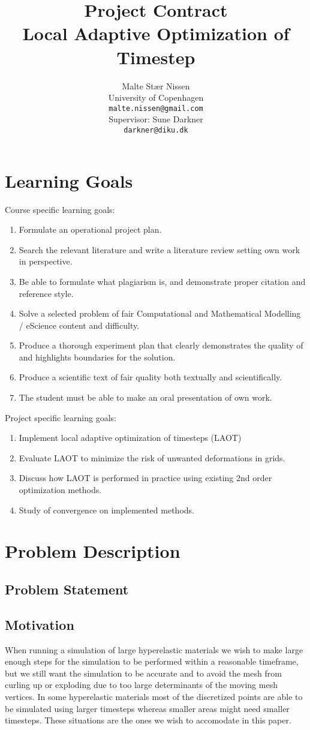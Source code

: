 \documentclass[11pt,a4paper]{article}
\title{Project Contract\\Local Adaptive Optimization of Timestep}
\author{Malte Stær Nissen\\University of Copenhagen\\\texttt{malte.nissen@gmail.com}\\Supervisor: Sune Darkner\\\texttt{darkner@diku.dk}}
\begin{document}
\maketitle

\section{Learning Goals}
Course specific learning goals:
\begin{enumerate}
	\item Formulate an operational project plan.
	\item Search the relevant literature and write a literature review setting own work in perspective.
	\item Be able to formulate what plagiarism is, and demonstrate proper citation and reference style.
	\item Solve a selected problem of fair Computational and Mathematical Modelling / eScience content and difficulty.
	\item Produce a thorough experiment plan that clearly demonstrates the quality of and highlights boundaries for the solution. 
	\item Produce a scientific text of fair quality both textually and scientifically.
	\item The student must be able to make an oral presentation of own work.
\end{enumerate}
Project specific learning goals:
\begin{enumerate}
    \item Implement local adaptive optimization of timesteps (LAOT)
	\item Evaluate LAOT to minimize the risk of unwanted deformations in grids.
    \item Discuss how LAOT is performed in practice using existing 2nd order optimization methods.
    \item Study of convergence on implemented methods.
\end{enumerate}

\section{Problem Description}

\subsection{Problem Statement}


\subsection{Motivation}
When running a simulation of large hyperelastic materials we wish to make
large enough steps for the simulation to be performed within a reasonable
timeframe, but we still want the simulation to be accurate and to avoid
the mesh from curling up or exploding due to too large determinants of the
moving mesh vertices. In some hyperelastic materials most of the
discretized points are able to be simulated using larger timesteps whereas
smaller areas might need smaller timesteps. These situations are the ones
we wish to accomodate in this paper.
\end{document}
